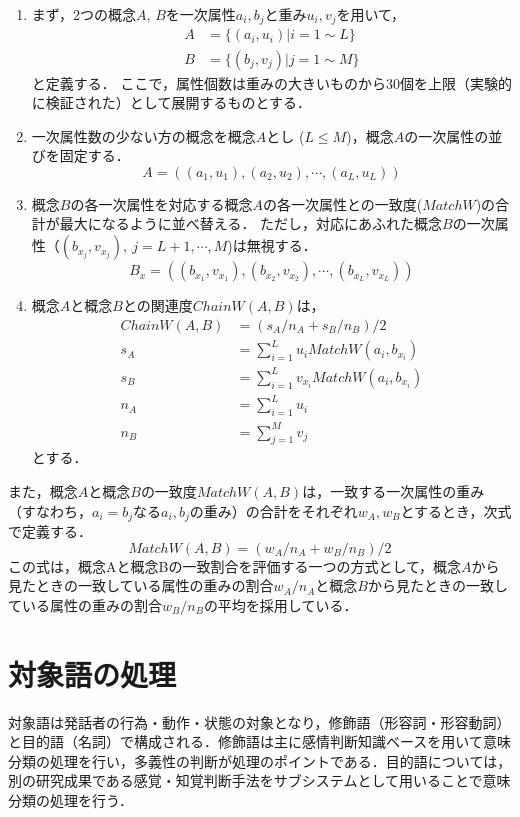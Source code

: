 \documentclass[japanese]{jnlp_1.3a}
\begin{document}
\begin{enumerate}
\item まず，2つの概念$A$, $B$を一次属性$a_i, b_j$と重み$u_i, v_j$を用いて，
{\allowdisplaybreaks
\begin{align*}
A &= \{ (a_i, u_i) | i=1\sim L \} 
	\\
B &= \{ (b_j, v_j) | j=1\sim M \}  
\end{align*}
}
と定義する．
ここで，属性個数は重みの大きいものから30個を上限（実験的に検証された）\cite{watabe:01}として展開するものとする．
\item 一次属性数の少ない方の概念を概念$A$とし ($L \le M$)，概念$A$の一次属性の並びを固定する．
\[
	A = ((a_1, u_1), (a_2, u_2), \cdots, (a_L, u_L)) 
\]
\item 概念$B$の各一次属性を対応する概念$A$の各一次属性との一致度($MatchW$)の合計が最大になるように並べ替える．
ただし，対応にあふれた概念$B$の一次属性（$(b_{x_j}, v_{x_j}), \ j=L+1, \cdots, M$)は無視する．
\[
  B_x = ((b_{x_1}, v_{x_1}), (b_{x_2}, v_{x_2}), \cdots, (b_{x_L}, v_{x_L}))
\]
\item 概念$A$と概念$B$との関連度$ChainW(A,B)$は，
\begin{align*}
	ChainW(A,B) &= (s_A/n_A+s_B/n_B)/2  \label{Echain} \\
	s_A &= \sum_{i=1}^L u_iMatchW(a_i, b_{x_i}) \\
	s_B &= \sum_{i=1}^L v_{x_i}MatchW(a_i, b_{x_i}) \\
	n_A &= \sum_{i=1}^L u_i \\
	n_B &= \sum_{j=1}^M v_j 
\end{align*}
とする．
\end{enumerate}

また，概念$A$と概念$B$の一致度$MatchW(A,B)$は，一致する一次属性の重み（すなわち，$a_i = b_j$なる$a_i, b_j$の重み）の合計をそれぞれ$w_A, w_B$とするとき，次式で定義する．
\[
 MatchW(A,B) = (w_A/n_A + w_B/n_B)/2	
\]
この式は，概念Aと概念Bの一致割合を評価する一つの方式として，概念$A$から見たときの一致している属性の重みの割合$w_A/n_A$と概念$B$から見たときの一致している属性の重みの割合$w_B/n_B$の平均を採用している．


\section{対象語の処理}\label{taishougo}
対象語は発話者の行為・動作・状態の対象となり，修飾語（形容詞・形容動詞）と目的語（名詞）で構成される．修飾語は主に感情判断知識ベースを用いて意味分類の処理を行い，多義性の判断が処理のポイントである．目的語については，別の研究成果である感覚・知覚判断手法\cite{horiguchi:02,watabe:04,kometani:03}をサブシステムとして用いることで意味分類の処理を行う．
\end{document}
